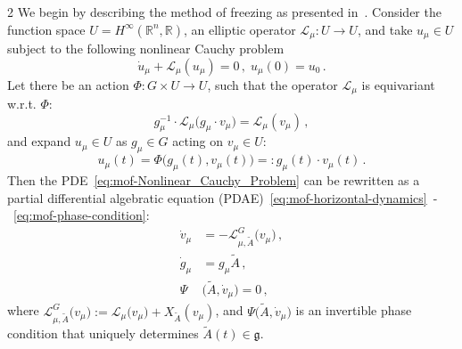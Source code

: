 \documentclass{article}
\newcommand{\g}{\mathfrak{g}}                               %
\newcommand{\R}{\mathbb{R}}                                 %
\begin{document}
\begin{multicols}{2}
We begin by describing the method of freezing as presented in~\cite{Ohlberger2013}.
Consider the function space $U =  H^\infty(\R^n,\R)$, an elliptic operator $\mathcal{L}_{\mu}:U\rightarrow U$, and take $u_\mu \in U$ subject to the following nonlinear Cauchy problem 
\begin{equation}\label{eq:mof-Nonlinear_Cauchy_Problem}
    \dot{u}_{\mu} + \mathcal{L}_{\mu}(u_{\mu}) = 0 \,, \; u_{\mu}(0) = u_0\,.
\end{equation}  
Let there be an action $\Phi:G\times U \rightarrow U$, such that the operator $\mathcal{L}_{\mu}$ is equivariant w.r.t. $\Phi$:
\begin{equation}\label{eq:mof_equivariance}
    g_\mu^{-1}\cdot \mathcal{L}_{\mu} \big(g_\mu\cdot v_\mu\big) = \mathcal{L}_{\mu}(v_\mu)\,,
\end{equation}
and expand $u_\mu \in U$ as $g_\mu \in G$ acting on $v_\mu \in U$:
\begin{equation}\label{eq:mof-general-action}
    u_\mu(t) = \Phi\big(g_\mu(t), v_\mu(t)\big) =: g_\mu(t) \cdot v_\mu(t) \,.
\end{equation}  
Then the PDE~\eqref{eq:mof-Nonlinear_Cauchy_Problem} can be rewritten as a partial differential algebratic equation (PDAE)~\eqref{eq:mof-horizontal-dynamics}~-~\eqref{eq:mof-phase-condition}:
\begin{align}\label{eq:mof-horizontal-dynamics} %
    \dot{v}_\mu &= - \mathcal{L}^G_{\mu,\widetilde{A}} \big(v_\mu\big) \,, \\
    \dot{g}_\mu &= g_\mu \widetilde{A}\,, \label{eq:mof-vertical-dynamics} \\ %
    \Psi&\big(\widetilde{A},\dot{v}_\mu\big) =  0\,, \label{eq:mof-phase-condition} 
\end{align} 
where $\mathcal{L}^G_{\mu,\widetilde{A}} \big(v_\mu\big) := \mathcal{L}_{\mu} \big(v_\mu\big) + X_{\widetilde{A}} (v_\mu)$, and $\Psi\big(\widetilde{A},\dot{v}_\mu\big)$ %
is an invertible phase condition that uniquely determines $\widetilde{A}(t)\in\g$.


\end{multicols}
\end{document}
